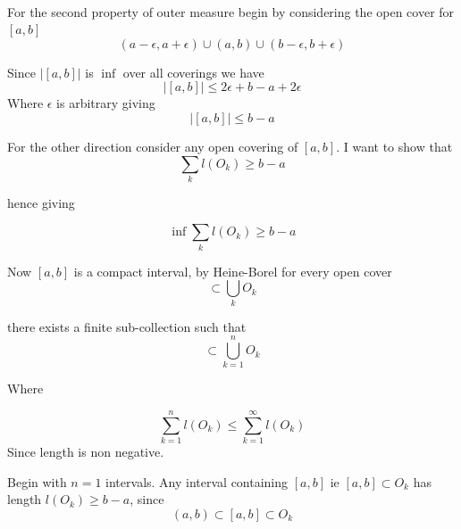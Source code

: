 \documentclass[12pt]{article}
\makeatletter
\theoremstyle{plain}
\theoremstyle{definition}
\theoremstyle{definition}
\theoremstyle{remark}
\renewenvironment{proof}[1][\proofname]{\par
\pushQED{\qed}\normalfont\topsep6\p@\@plus6\p@\relax
\trivlist\item[\hskip\labelsep\small\itshape #1\@addpunct{.}]\ignorespaces\mbox{}\\
}{\popQED\endtrivlist\@endpefalse}
\makeatother
\begin{document}
\begin{proof}[Proof: $\lvert [a, b{]}\rvert = b - a$]
    For the second property of outer measure begin by considering the open cover
    for $[a, b]$
    \begin{equation*}
        (a - \epsilon, a + \epsilon) \cup (a, b) \cup (b - \epsilon, b + \epsilon)
    \end{equation*}

    Since $|[a, b]|$ is $\inf$ over all coverings we have 
    \begin{equation*}
        |[a, b]| \leq 2\epsilon + b - a + 2\epsilon
    \end{equation*}
    Where $\epsilon$ is arbitrary giving 
    \begin{equation*}
        |[a, b]| \leq b - a
    \end{equation*}

    For the other direction consider any open covering of $[a, b]$. I want to show that
    \begin{equation*}
        \sum_k l(O_k) \geq b - a
    \end{equation*}

    hence giving 
    
    \begin{equation*}
        \inf \sum_k l(O_k) \geq b - a
    \end{equation*}
    
    Now $[a, b]$ is a compact interval, by Heine-Borel for every open cover
    \begin{equation*}
        [a, b] \subset \bigcup_k O_k
    \end{equation*}
    
    there exists a finite sub-collection such that
    \begin{equation*}
        [a, b] \subset \bigcup_{k=1}^{n} O_k
    \end{equation*}
    
    Where

    \begin{equation*}
        \sum_{k=1}^{n} l(O_k) \leq \sum_{k=1}^{\infty} l(O_k)
    \end{equation*}
    Since length is non negative. 

    Begin with $n=1$ intervals. Any interval containing $[a, b]$ ie
    $[a, b] \subset O_k$ has length $l(O_k) \geq b - a$,
    since 
    \begin{equation*}
        (a, b) \subset [a, b] \subset O_k
    \end{equation*}


\end{proof}
\end{document}
